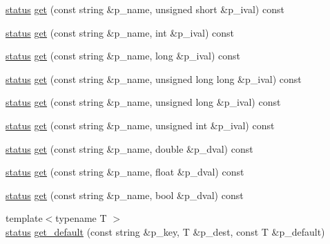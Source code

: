 \begin{DoxyCompactItemize}
\item 
\hyperlink{namespacextd_a68ed4fe8e9c11116b68efe5b102aec50}{status} \hyperlink{classxtd_1_1ConfParser_abd0bb9c9e8568c0b2dd28b133f700681}{get} (const string \&p\-\_\-name, unsigned short \&p\-\_\-ival) const 
\item 
\hyperlink{namespacextd_a68ed4fe8e9c11116b68efe5b102aec50}{status} \hyperlink{classxtd_1_1ConfParser_a902dfe3ab82e8d1710659f65fa0e853b}{get} (const string \&p\-\_\-name, int \&p\-\_\-ival) const 
\item 
\hyperlink{namespacextd_a68ed4fe8e9c11116b68efe5b102aec50}{status} \hyperlink{classxtd_1_1ConfParser_aeabbb63eeeafaf9d0853fdcf5b2a83eb}{get} (const string \&p\-\_\-name, long \&p\-\_\-ival) const 
\item 
\hyperlink{namespacextd_a68ed4fe8e9c11116b68efe5b102aec50}{status} \hyperlink{classxtd_1_1ConfParser_a38c007fd9a93cf370a9e2de14e021faf}{get} (const string \&p\-\_\-name, unsigned long long \&p\-\_\-ival) const 
\item 
\hyperlink{namespacextd_a68ed4fe8e9c11116b68efe5b102aec50}{status} \hyperlink{classxtd_1_1ConfParser_a39e678dc0205b82f4cce76533f4f4d84}{get} (const string \&p\-\_\-name, unsigned long \&p\-\_\-ival) const 
\item 
\hyperlink{namespacextd_a68ed4fe8e9c11116b68efe5b102aec50}{status} \hyperlink{classxtd_1_1ConfParser_a1e8fd9399881ef9910fd144377ff4c93}{get} (const string \&p\-\_\-name, unsigned int \&p\-\_\-ival) const 
\item 
\hyperlink{namespacextd_a68ed4fe8e9c11116b68efe5b102aec50}{status} \hyperlink{classxtd_1_1ConfParser_a6d091368a02f05c377c7d27d748b64be}{get} (const string \&p\-\_\-name, double \&p\-\_\-dval) const 
\item 
\hyperlink{namespacextd_a68ed4fe8e9c11116b68efe5b102aec50}{status} \hyperlink{classxtd_1_1ConfParser_ac0d9efc31b6b6989f4a9f6061ad03596}{get} (const string \&p\-\_\-name, float \&p\-\_\-dval) const 
\item 
\hyperlink{namespacextd_a68ed4fe8e9c11116b68efe5b102aec50}{status} \hyperlink{classxtd_1_1ConfParser_a8a8e729b8e11c5efd19dec29baa31f66}{get} (const string \&p\-\_\-name, bool \&p\-\_\-dval) const 
\item 
{\footnotesize template$<$typename T $>$ }\\\hyperlink{namespacextd_a68ed4fe8e9c11116b68efe5b102aec50}{status} \hyperlink{classxtd_1_1ConfParser_aa3a209f68c61547141194a305049eeae}{get\-\_\-default} (const string \&p\-\_\-key, T \&p\-\_\-dest, const T \&p\-\_\-default)
\item 

\end{DoxyCompactItemize}
